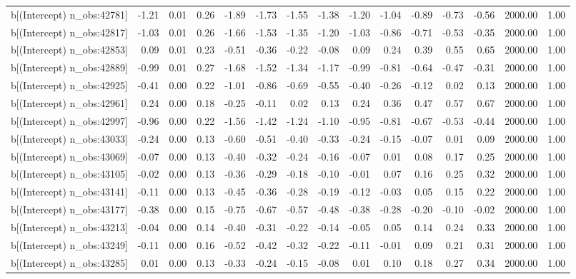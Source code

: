 \begin{table}[ht]
\begin{tabular}{rrrrrrrrrrrrrrr}
  b[(Intercept) n\_obs:42781] & -1.21 & 0.01 & 0.26 & -1.89 & -1.73 & -1.55 & -1.38 & -1.20 & -1.04 & -0.89 & -0.73 & -0.56 & 2000.00 & 1.00 \\ 
  b[(Intercept) n\_obs:42817] & -1.03 & 0.01 & 0.26 & -1.66 & -1.53 & -1.35 & -1.20 & -1.03 & -0.86 & -0.71 & -0.53 & -0.35 & 2000.00 & 1.00 \\ 
  b[(Intercept) n\_obs:42853] & 0.09 & 0.01 & 0.23 & -0.51 & -0.36 & -0.22 & -0.08 & 0.09 & 0.24 & 0.39 & 0.55 & 0.65 & 2000.00 & 1.00 \\ 
  b[(Intercept) n\_obs:42889] & -0.99 & 0.01 & 0.27 & -1.68 & -1.52 & -1.34 & -1.17 & -0.99 & -0.81 & -0.64 & -0.47 & -0.31 & 2000.00 & 1.00 \\ 
  b[(Intercept) n\_obs:42925] & -0.41 & 0.00 & 0.22 & -1.01 & -0.86 & -0.69 & -0.55 & -0.40 & -0.26 & -0.12 & 0.02 & 0.13 & 2000.00 & 1.00 \\ 
  b[(Intercept) n\_obs:42961] & 0.24 & 0.00 & 0.18 & -0.25 & -0.11 & 0.02 & 0.13 & 0.24 & 0.36 & 0.47 & 0.57 & 0.67 & 2000.00 & 1.00 \\ 
  b[(Intercept) n\_obs:42997] & -0.96 & 0.00 & 0.22 & -1.56 & -1.42 & -1.24 & -1.10 & -0.95 & -0.81 & -0.67 & -0.53 & -0.44 & 2000.00 & 1.00 \\ 
  b[(Intercept) n\_obs:43033] & -0.24 & 0.00 & 0.13 & -0.60 & -0.51 & -0.40 & -0.33 & -0.24 & -0.15 & -0.07 & 0.01 & 0.09 & 2000.00 & 1.00 \\ 
  b[(Intercept) n\_obs:43069] & -0.07 & 0.00 & 0.13 & -0.40 & -0.32 & -0.24 & -0.16 & -0.07 & 0.01 & 0.08 & 0.17 & 0.25 & 2000.00 & 1.00 \\ 
  b[(Intercept) n\_obs:43105] & -0.02 & 0.00 & 0.13 & -0.36 & -0.29 & -0.18 & -0.10 & -0.01 & 0.07 & 0.16 & 0.25 & 0.32 & 2000.00 & 1.00 \\ 
  b[(Intercept) n\_obs:43141] & -0.11 & 0.00 & 0.13 & -0.45 & -0.36 & -0.28 & -0.19 & -0.12 & -0.03 & 0.05 & 0.15 & 0.22 & 2000.00 & 1.00 \\ 
  b[(Intercept) n\_obs:43177] & -0.38 & 0.00 & 0.15 & -0.75 & -0.67 & -0.57 & -0.48 & -0.38 & -0.28 & -0.20 & -0.10 & -0.02 & 2000.00 & 1.00 \\ 
  b[(Intercept) n\_obs:43213] & -0.04 & 0.00 & 0.14 & -0.40 & -0.31 & -0.22 & -0.14 & -0.05 & 0.05 & 0.14 & 0.24 & 0.33 & 2000.00 & 1.00 \\ 
  b[(Intercept) n\_obs:43249] & -0.11 & 0.00 & 0.16 & -0.52 & -0.42 & -0.32 & -0.22 & -0.11 & -0.01 & 0.09 & 0.21 & 0.31 & 2000.00 & 1.00 \\ 
  b[(Intercept) n\_obs:43285] & 0.01 & 0.00 & 0.13 & -0.33 & -0.24 & -0.15 & -0.08 & 0.01 & 0.10 & 0.18 & 0.27 & 0.34 & 2000.00 & 1.00 \\ 

\end{tabular}
\end{table}

